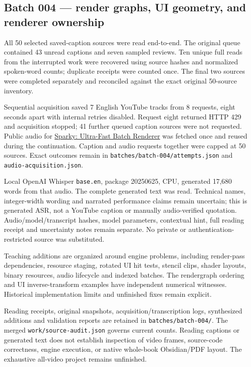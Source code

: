 \subsection{Batch 004 --- render graphs, UI geometry, and renderer ownership}\label{appendix-877738f6f4d2-batch-004-render-graphs-ui-geometry-and-renderer-ownership}

All 50 selected saved-caption sources were read end-to-end. The original queue contained 43 unread captions and seven sampled reviews. Ten unique full reads from the interrupted work were recovered using source hashes and normalized spoken-word counts; duplicate receipts were counted once. The final two sources were completed separately and reconciled against the exact original 50-source inventory.

Sequential acquisition saved 7 English YouTube tracks from 8 requests, eight seconds apart with internal retries disabled. Request eight returned HTTP 429 and acquisition stopped; 41 further queued caption sources were not requested. Public audio for \href{https://www.youtube.com/watch?v=ImtWD_9OAeY}{Sparky: Ultra-Fast Batch Renderer} was fetched once and reused during the continuation. Caption and audio requests together were capped at 50 sources. Exact outcomes remain in \texttt{batches/batch-004/attempts.json} and \texttt{audio-acquisition.json}.

Local OpenAI Whisper \texttt{base.en}, package 20250625, CPU, generated 17,680 words from that audio. The complete generated text was read. Technical names, integer-width wording and narrated performance claims remain uncertain; this is generated ASR, not a YouTube caption or manually audio-verified quotation. Audio/model/transcript hashes, model parameters, contextual hint, full reading receipt and uncertainty notes remain separate. No private or authentication-restricted source was substituted.

Teaching additions are organized around engine problems, including render-pass dependencies, resource staging, rotated UI hit tests, stencil clips, shader layouts, binary resources, audio lifecycle and indexed batches. The rendergraph ordering and UI inverse-transform examples have independent numerical witnesses. Historical implementation limits and unfinished fixes remain explicit.

Reading receipts, original snapshots, acquisition/transcription logs, synthesized additions and validation reports are retained in \texttt{batches/batch-004/}. The merged \texttt{work/source-audit.json} governs current counts. Reading captions or generated text does not establish inspection of video frames, source-code correctness, engine execution, or native whole-book Obsidian/PDF layout. The exhaustive all-video project remains unfinished.

